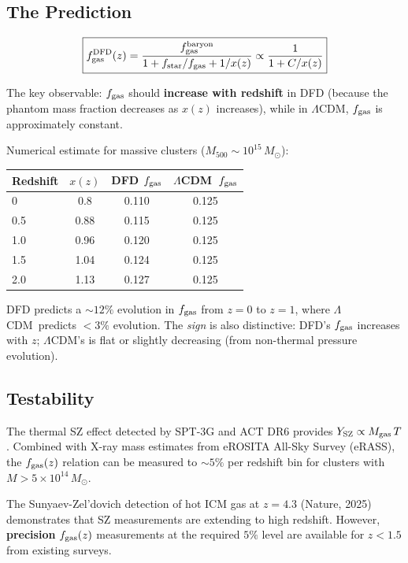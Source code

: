 \documentclass[11pt]{article}
\newcommand{\LCDM}{$\Lambda$CDM}
\begin{document}
\subsection{The Prediction}

\begin{equation}
\boxed{
f_{\rm gas}^{\rm DFD}(z) = \frac{f_{\rm gas}^{\rm baryon}}{1 + f_{\rm star}/f_{\rm gas} + 1/x(z)}
\propto \frac{1}{1 + C/x(z)}
}
\end{equation}

The key observable: $f_{\rm gas}$ should \textbf{increase with redshift} in DFD
(because the phantom mass fraction decreases as $x(z)$ increases), while in
\LCDM, $f_{\rm gas}$ is approximately constant.

Numerical estimate for massive clusters ($M_{500} \sim 10^{15}\,M_\odot$):
\begin{center}
\begin{tabular}{lccc}
\toprule
Redshift & $x(z)$ & DFD $f_{\rm gas}$ & \LCDM\ $f_{\rm gas}$ \\
\midrule
0 & 0.8 & 0.110 & 0.125 \\
0.5 & 0.88 & 0.115 & 0.125 \\
1.0 & 0.96 & 0.120 & 0.125 \\
1.5 & 1.04 & 0.124 & 0.125 \\
2.0 & 1.13 & 0.127 & 0.125 \\
\bottomrule
\end{tabular}
\end{center}

DFD predicts a $\sim 12\%$ evolution in $f_{\rm gas}$ from $z = 0$ to $z = 1$,
where \LCDM\ predicts $< 3\%$ evolution. The \emph{sign} is also distinctive:
DFD's $f_{\rm gas}$ increases with $z$; \LCDM's is flat or slightly decreasing
(from non-thermal pressure evolution).

\subsection{Testability}

The thermal SZ effect detected by SPT-3G and ACT DR6 provides $Y_{\rm SZ}
\propto M_{\rm gas}\,T$. Combined with X-ray mass estimates from eROSITA
All-Sky Survey (eRASS), the $f_{\rm gas}(z)$ relation can be measured to
$\sim 5\%$ per redshift bin for clusters with $M > 5 \times 10^{14}\,M_\odot$.

The Sunyaev-Zel'dovich detection of hot ICM gas at $z = 4.3$ (Nature, 2025)
demonstrates that SZ measurements are extending to high redshift. However,
\textbf{precision} $f_{\rm gas}(z)$ measurements at the required $5\%$ level
are available for $z < 1.5$ from existing surveys.
\end{document}

